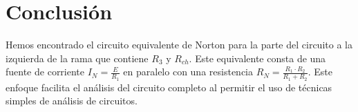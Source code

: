 \documentclass[12pt,a4paper]{article}
\begin{document}
\section{Conclusión}
Hemos encontrado el circuito equivalente de Norton para la parte del circuito a la 
izquierda de la rama que contiene $R_3$ y $R_{ch}$. 
Este equivalente consta de una fuente de corriente $I_N = \frac{E}{R_1}$ en 
paralelo con una resistencia $R_N = \frac{R_1 \cdot R_2}{R_1 + R_2}$. 
Este enfoque facilita el análisis del circuito completo al permitir el uso de 
técnicas simples de análisis de circuitos.
\end{document}
